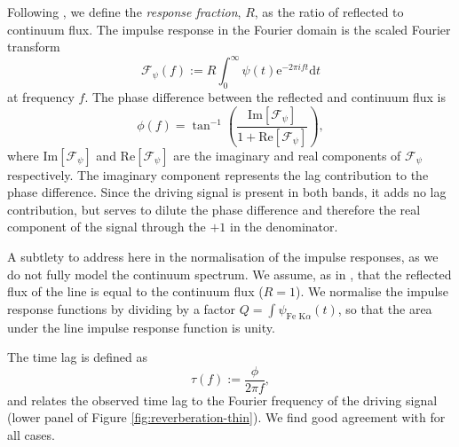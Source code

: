 \documentclass[fleqn,usenatbib]{mnras}
\newcommand{\e}{\text{e}}
\renewcommand{\d}{\text{d}}
\renewcommand{\Im}[1]{\text{Im}\left[#1\right]}
\renewcommand{\Re}[1]{\text{Re}\left[#1\right]}
\begin{document}
Following \cite{cackett_modelling_2014}, we define the \textit{response
fraction}, $R$, as the ratio of reflected to continuum flux. The impulse response
in the Fourier domain is the scaled Fourier transform
\begin{equation}
    \mathscr{F}_\psi(f) := R \int_{0}^\infty \psi(t) \e^{-2\pi i f t} \d t
\end{equation}
at frequency $f$.
The phase difference between the reflected and continuum flux is
\begin{equation}
    \phi(f) = \tan^{-1} \left(
        \frac{\Im{\mathscr{F}_\psi}}{1 + \Re{\mathscr{F}_\psi}}
    \right),
\end{equation}
where $\Im{\mathscr{F}_\psi}$ and $\Re{\mathscr{F}_\psi}$ are the imaginary and
real components of $\mathscr{F}_\psi$ respectively. The imaginary component
represents the lag contribution to the phase difference. Since the driving
signal is present in both bands, it adds no lag contribution, but serves to
dilute the phase difference and therefore the real component of the signal
through the $+1$ in the denominator.

A subtlety to address here in the normalisation of the impulse responses, as we
do not fully model the continuum spectrum. We assume, as in
\cite{cackett_modelling_2014}, that the reflected flux of the line is equal to
the continuum flux ($R = 1$). We normalise the impulse response functions by
dividing by a factor $Q = \int \psi_{\text{Fe K}\alpha}(t)$, so that the area
under the line impulse response function is unity.


The time lag is defined as
\begin{equation}
    \tau(f) := \frac{\phi}{2 \pi f},
\end{equation}
and relates the observed time lag to the Fourier frequency of the driving
signal (lower panel of Figure \ref{fig:reverberation-thin}).  We find good
agreement with \cite{cackett_modelling_2014} for all cases.
\end{document}
